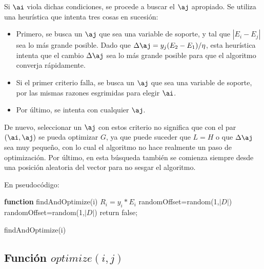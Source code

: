 Si $\ai$ viola dichas condiciones, se procede a buscar el $\aj$ apropiado. Se utiliza una heurística que intenta tres cosas en sucesión:
\begin{itemize}
\item Primero, se busca un $\aj$ que sea una variable de soporte, y tal que $|E_i-E_j|$ sea lo más grande posible. Dado que $\Delta \aj = y_j (E_2-E_1) / \eta$, esta heurística intenta que el cambio $\Delta \aj$ sea lo más grande posible para que el algoritmo converja rápidamente.
\item Si el primer criterio falla, se busca un $\aj$ que sea una variable de soporte, por las mismas razones esgrimidas para elegir $\ai$.
\item Por último, se intenta con cualquier $\aj$.
\end{itemize}

De nuevo, seleccionar un $\aj$ con estos criterio no significa que con el par $(\ai,\aj)$ se pueda optimizar $G$, ya que puede suceder que $L=H$ o que $\Delta \aj$ sea muy pequeño, con lo cual el algoritmo no hace realmente un paso de optimización. Por último, en esta búsqueda también se comienza siempre desde una posición aleatoria del vector para no sesgar el algoritmo.

En pseudocódigo:

\begin{function}[H]
\textbf{function} findAndOptimize(i) \;
	$R_i = y_i * E_i$ \;
  randomOffset=random(1,$|D|$) \;
 	randomOffset=random(1,$|D|$) \;
  return false;
\caption{findAndOptimize(i) } 
\end{function}
\vspace{10pt}

\subsection{Función $optimize(i,j)$}

